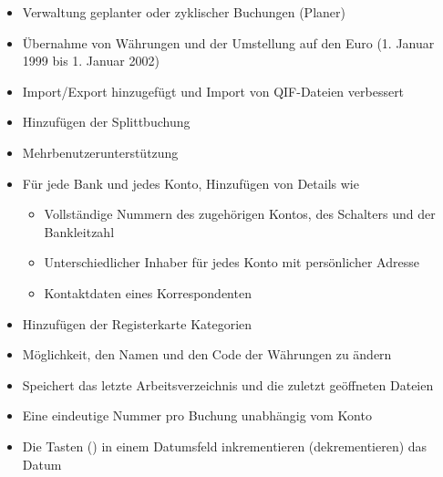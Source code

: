 \begin{itemize}
	\item Verwaltung geplanter oder zyklischer Buchungen (Planer)%
	\item Übernahme von Währungen und der Umstellung auf den Euro (1. Januar 1999 bis 1. Januar 2002)%
	\item Import/Export hinzugefügt und Import von \gls{QIF}-Dateien verbessert%
	\item Hinzufügen der Splittbuchung%
	\item Mehrbenutzerunterstützung%
	\item Für jede Bank und jedes Konto, Hinzufügen von Details wie%
		\begin{itemize}
		\item[\textopenbullet] Vollständige Nummern des zugehörigen Kontos, des Schalters und der Bankleitzahl%
		\item[\textopenbullet] Unterschiedlicher Inhaber für jedes Konto mit persönlicher Adresse%
		\item[\textopenbullet] Kontaktdaten eines Korrespondenten%
		\end{itemize}
	\item Hinzufügen der Registerkarte Kategorien%
	\item Möglichkeit, den Namen und den Code der Währungen zu ändern%
	\item Speichert das letzte Arbeitsverzeichnis und die zuletzt geöffneten Dateien%
	\item Eine eindeutige Nummer pro Buchung unabhängig vom Konto%
	\item Die Tasten \keys{{+}} (\keys{{-}}) in einem Datumsfeld inkrementieren (dekrementieren) das Datum%

\end{itemize}
